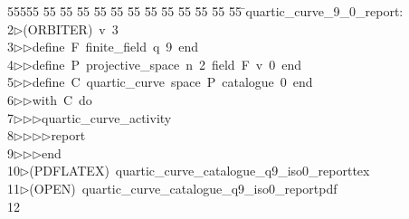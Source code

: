 %
%
\begin{tabbing}
55555 \= 55 \= 55 \= 55 \= 55 \= 55 \= 55 \= 55 \= 55 \= 55 \= 55 \= 55 \= 55 \= \>quartic\_curve\_9\_0\_report:\ \\[0pt]
2\>$\triangleright$\>(ORBITER)\ v\ 3\ \\[0pt]
3\>$\triangleright$\>$\triangleright$\>define\ F\ finite\_field\ q\ 9\ end\ \\[0pt]
4\>$\triangleright$\>$\triangleright$\>define\ P\ projective\_space\ n\ 2\ field\ F\ v\ 0\ end\ \\[0pt]
5\>$\triangleright$\>$\triangleright$\>define\ C\ quartic\_curve\ space\ P\ catalogue\ 0\ end\ \\[0pt]
6\>$\triangleright$\>$\triangleright$\>with\ C\ do\ \\[0pt]
7\>$\triangleright$\>$\triangleright$\>$\triangleright$\>quartic\_curve\_activity\ \\[0pt]
8\>$\triangleright$\>$\triangleright$\>$\triangleright$\>$\triangleright$\>report\ \\[0pt]
9\>$\triangleright$\>$\triangleright$\>$\triangleright$\>end\\[0pt]
10\>$\triangleright$\>(PDFLATEX)\ quartic\_curve\_catalogue\_q9\_iso0\_reporttex\\[0pt]
11\>$\triangleright$\>(OPEN)\ quartic\_curve\_catalogue\_q9\_iso0\_reportpdf\\[0pt]
12\>\end{tabbing}
